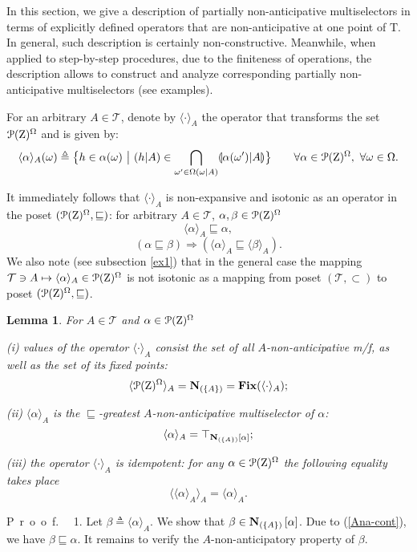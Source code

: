 \documentclass[sn-mathphys,Numbered,pdflatex]{sn-jnl}%
\theoremstyle{thmstyleone}%
\theoremstyle{thmstyletwo}%
\theoremstyle{thmstylethree}%
\newtheorem{lem}{Lemma}
\renewcommand{\proof}{\par\mbox{P r o o f.}\ \ }
\newcommand{\beq}{\begin{equation}}
\newcommand{\eeq}{\end{equation}}
\newcommand{\mydef}{\mathrel{\triangleq}}%
\newcommand{\icP}[1]{\EuScript{P}({#1})}%
\newcommand{\res}[2]{\ensuremath{(#1|#2)}}%
\newcommand{\myLe}{\mathrel{\sqsubseteq}}%
\newcommand{\naOm}{\ensuremath{\Omega}}%
\newcommand{\naZ}{\ensuremath{\mathrm{Z}}}%
\newcommand{\naT}{\ensuremath{\mathrm{T}}}%
\newcommand{\naTc}{\ensuremath{\mathcal{T}}}%
\newcommand{\naOmo}[2]{\naOm\setbox0=\hbox{\text{$#1$}}\ifdim\wd0=0pt\else\res{#1}{#2}\fi}%
\newcommand{\AnaN}[2]{\mathbf{N}_{(#1)}\setbox0=\hbox{\text{$#2$}}\ifdim\wd0=0pt\else\left[{#2}\right]\fi}%
\newcommand{\sres}[2]{\llparenthesis#1|#2\rrparenthesis}%
\newcommand{\Ana}[2]{\ensuremath{\langle{#1}\rangle_{#2}}}%
\newcommand{\fix}[1]{\ensuremath{{\mathbf{Fix}({#1})}}}%
\newcommand{\fref}[1]{{\rm(\ref{#1})}}   %
\begin{document}
In this section, we give a description of partially non-anticipative multiselectors in terms of explicitly defined operators that are non-anticipative at one point of $\naT$.
In general, such description is certainly non-constructive.
Meanwhile, when applied to step-by-step procedures, due to the finiteness of operations, the description allows to construct and analyze corresponding partially non-an\-ti\-ci\-pat\-ive multiselectors (see examples).

For an arbitrary $A\in\naTc$, denote by $\Ana{\cdot}{A}$ the operator that transforms the set $\icP\naZ^\naOm$ and is given by:
\beq\label{def-Ana}
\Ana{\alpha}{A}(\omega)\mydef\bigl\{h\in\alpha(\omega)\ \bigr|\ \res hA\in\bigcap_{\omega'\in\naOmo\omega A}\sres{\alpha(\omega')}A\bigr\}\qquad \forall\alpha\in\icP\naZ^\naOm,\ \forall\omega\in\naOm.
\eeq

It immediately follows that  $\Ana{\cdot}{A}$ is non-expansive and isotonic as an operator in the poset $(\icP\naZ^\naOm, \myLe)$:
for arbitrary $A\in\naTc$, $\alpha,\beta\in\icP\naZ^\naOm$
\beq\label{Ana-cont}
\Ana{\alpha}{A}\myLe\alpha,
\eeq
\beq\label{Ana-isot}
(\alpha\myLe\beta)\Rightarrow\left(\Ana{\alpha}{A}\myLe\Ana{\beta}{A}\right).
\eeq
We also note (see subsection \ref{ex1}) that in the general case the mapping $\naTc\ni A\mapsto\Ana{\alpha}{A}\in\icP\naZ^\naOm$ is not isotonic as a mapping from poset $(\naTc,\subset)$ to poset $(\icP\naZ^\naOm,\myLe)$.

\begin{lem}\label{lem-Ana-max}
For $A\in\naTc$ and $\alpha\in\icP\naZ^\naOm$

{\rm (i)} values of the operator $\Ana{\cdot}{A}$ consist the set of all $A$-non-anticipative m/f, as well as the set of its fixed points:
\beq\label{Ana-fix}
\Ana{\icP\naZ^\naOm}{A}=\AnaN{\{A\}}{}=\fix{\Ana{\cdot}{A}};
\eeq

{\rm (ii)} $\Ana{\alpha}{A}$ is the $\myLe$-greatest $A$-non-anticipative multiselector of $\alpha$:
\beq\label{Ana-max}
\Ana{\alpha}{A}=\top_{\AnaN{\{A\}}\alpha};
\eeq

{\rm (iii)} the operator \Ana{\cdot}A is idempotent:
for any $\alpha\in\icP\naZ^\naOm$ the following equality takes place
\beq\label{Ana-idemp}
\Ana{\Ana{\alpha}A}A=\Ana{\alpha}A.
\eeq
\end{lem}

\proof
1.
Let $\beta\mydef\Ana{\alpha}{A}$.
We show that $\beta\in\AnaN{\{A\}}\alpha$.
Due to \fref{Ana-cont}, we have $\beta\myLe\alpha$.
It remains to verify the $A$-non-anticipatory property of $\beta$.
\end{document}
